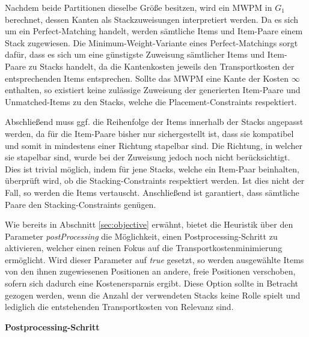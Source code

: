 Nachdem beide Partitionen dieselbe Größe besitzen, wird ein \textsc{MWPM} in $G_1$ berechnet, dessen Kanten als
Stackzuweisungen interpretiert werden. Da es sich um ein Perfect-Matching handelt, werden sämtliche Items und Item-Paare einem Stack zugewiesen. Die Minimum-Weight-Variante eines Perfect-Matchings sorgt dafür, dass es sich um eine günstigste Zuweisung sämtlicher Items und Item-Paare zu Stacks handelt, da die Kantenkosten jeweils den Transportkosten der entsprechenden Items entsprechen. Sollte das \textsc{MWPM} eine Kante der Kosten $\infty$ enthalten, so existiert keine zulässige Zuweisung der generierten Item-Paare und Unmatched-Items zu den Stacks, welche die Placement-Constraints respektiert.

Abschließend muss ggf. die Reihenfolge der Items innerhalb der Stacks angepasst werden, da für die Item-Paare bisher nur sichergestellt ist, dass sie kompatibel und somit in mindestens einer Richtung stapelbar sind. Die Richtung, in welcher sie stapelbar sind, wurde bei der Zuweisung jedoch noch nicht berücksichtigt. Dies ist trivial möglich, indem für jene Stacks, welche ein Item-Paar beinhalten, überprüft wird, ob die Stacking-Constraints respektiert werden. Ist dies nicht der Fall, so werden die Items vertauscht. Anschließend ist garantiert, dass sämtliche Paare den Stacking-Constraints genügen.

Wie bereits in Abschnitt \ref{sec:objective} erwähnt, bietet die Heuristik über den Parameter
\textit{postProcessing} die Möglichkeit, einen Postprocessing-Schritt zu aktivieren, welcher einen reinen Fokus
auf die Transportkostenminimierung ermöglicht. Wird dieser Parameter auf \textit{true} gesetzt, so werden
ausgewählte Items von den ihnen zugewiesenen Positionen an andere, freie Positionen verschoben,
sofern sich dadurch eine Kostenersparnis ergibt. Diese Option sollte in Betracht gezogen werden,
wenn die Anzahl der verwendeten Stacks keine Rolle spielt und lediglich die entstehenden Transportkosten
von Relevanz sind.

\textbf{Postprocessing-Schritt}

